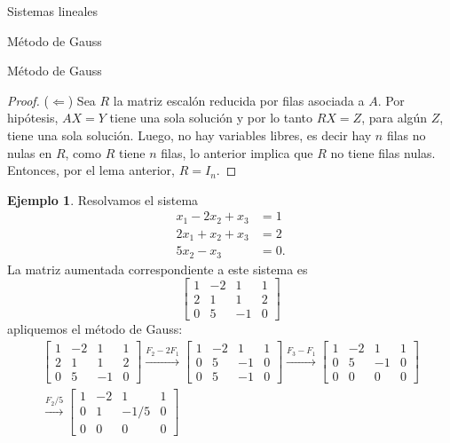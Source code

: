 \documentclass[a4paper,12pt,twoside,spanish]{amsbook}
\theoremstyle{definition}
\newtheorem{ejemplo}{Ejemplo}[section]
\theoremstyle{remark}
\begin{document}
\begin{chapter}{Sistemas lineales}
\begin{section}{Método de Gauss }
\begin{subsection}{Método de Gauss}
\begin{proof}
					($\Leftarrow$) Sea $R$ la matriz escalón reducida por filas asociada a $A$. Por hipótesis, $AX=Y$ tiene una sola solución y  por lo tanto $RX=Z$, para algún $Z$, tiene una sola solución. Luego, no hay variables libres, es decir hay $n$ filas no nulas en $R$, como $R$ tiene $n$ filas, lo anterior implica que $R$ no tiene filas nulas. Entonces, por el lema anterior, $R=I_n$.
				\end{proof}
			\end{subsection}
			
			
			
				\begin{ejemplo} Resolvamos el sistema
					\begin{align*}
					x_1 -2x_2 + x_3  &= 1\\
					2x_1 +x_2 + x_3  &= 2\\
					5x_2 - x_3  &= 0.
					\end{align*}
					La matriz  aumentada correspondiente a este sistema es
					\begin{equation*}
					 \left[\begin{array}{rrr|r} 
					 1 & -2 & 1 &  1 \\ 2 & 1 & 1 &  2 \\ 0 & 5 & -1 &  0 
					\end{array}\right]
					\end{equation*}
					apliquemos el método de Gauss:
					\begin{multline*}
					\left[\begin{array}{rrr|r}1 & -2 & 1 &  1 \\ 2 & 1 & 1 &  2 \\	0 & 5 & -1 &  0  \end{array}\right]
					\stackrel{F_2 - 2F_1}{\longrightarrow} 
					\left[\begin{array}{rrr|r}1 & -2 & 1 &  1 \\ 0 & 5 & -1 &  0 \\	0 & 5 & -1 &  0  \end{array}\right]
					\stackrel{F_3-F_1}{\longrightarrow} 
					\left[\begin{array}{rrr|r}1 & -2 & 1 &  1 \\ 0 & 5 & -1 &  0 \\	0 & 0 & 0 & 0  \end{array}\right]
					\\
					\stackrel{F_2/5}{\longrightarrow} 
					\left[\begin{array}{rrr|r}1 & -2 & 1 &  1 \\ 0 & 1 & -1/5 &  0 \\	0 & 0 & 0 &  0  \end{array}\right]

\end{multline*}
\end{ejemplo}
\end{section}
\end{chapter}
\end{document}
